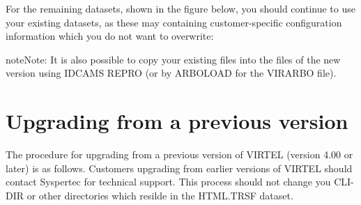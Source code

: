 \documentclass[letterpaper,10pt,english]{sphinxmanual}
\begin{document}

For the remaining datasets, shown in the figure below, you should continue to use your existing datasets, as these may containing customer-specific configuration information which you do not want to overwrite:

\begin{sphinxVerbatim}[commandchars=\\\{\}]
\end{sphinxVerbatim}


\begin{sphinxadmonition}{note}{Note:}
It is also possible to copy your existing files into the files of the new version using IDCAMS REPRO (or by ARBOLOAD for the VIRARBO file).
\end{sphinxadmonition}

\newpage


\section{Upgrading from a previous version}
\label{\detokenize{Installation_Guide:index-6}}\label{\detokenize{Installation_Guide:id2}}
The procedure for upgrading from a previous version of VIRTEL (version 4.00 or later) is as follows. Customers upgrading from earlier versions of VIRTEL should contact Syspertec for technical support. This process should not change you CLI-DIR or other directories which resilde in the HTML.TRSF dataset.
\end{document}
